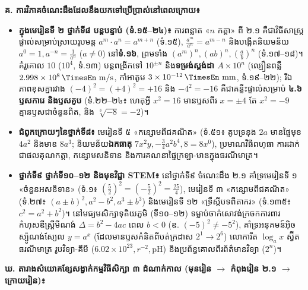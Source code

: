 \documentclass[a4paper,12pt]{article}
\newcommand{\en}[1]{{\TimesEn #1}}
\newcommand{\unit}[1]{\,\text{\en{#1}}}
\begin{document}
\Needspace{1.5cm}
\textbf{គ\en{.} ការវិភាគចំណេះដឹងដែលនឹងយកទៅប្រើប្រាស់នៅពេលក្រោយ៖}
\begin{itemize}[leftmargin=0.65cm, itemsep=3.2pt]
  \item \textbf{ក្នុងមេរៀនទី ២ ថ្នាក់ទី៨ បន្តបន្ទាប់ (ទំ\en{.}១៥\en{--}២៤)៖} ការពន្លាត «$n$ កត្តា» ពី ២\en{.}១ គឺជាវិធីសាស្ត្រផ្ទាល់សម្រាប់ស្រាយរូបមន្ត $a^m\cdot a^n = a^{m+n}$ (ទំ\en{.}១៥), $\frac{a^m}{a^n} = a^{m-n}$ និងបង្កើតនិយមន័យ $a^0=1, a^{-n}=\frac{1}{a^n}$ ($a\neq 0$) នៅ\textbf{ទំ\en{.}១៦}, ព្រមទាំង $(a^m)^n, (ab)^n, (\frac{a}{b})^n$ (ទំ\en{.}១៧\en{--}១៨)។ គំរូគោល $10$ ($10^4$, ទំ\en{.}១៣) បន្តពង្រីកទៅ $10^{\pm n}$ និង\textbf{ទម្រង់ស្តង់ដា $A\times 10^n$} (ល្បឿនពន្លឺ $2.998\times 10^8\unit{m/s}$, កាំអាតូម $3\times 10^{-12}\unit{mm}$, ទំ\en{.}១៩\en{--}២២); រីឯភាពខុសគ្នារវាង $(-4)^2 = (+4)^2 = +16$ និង $-4^2 = -16$ គឺជាគន្លឹះផ្ទាល់សម្រាប់ \textbf{៤\en{.}៦ ឫសការេ និងឫសគូប} (ទំ\en{.}២២\en{--}២៤៖ ហេតុអ្វី $x^2=16$ មានឫសពីរ $x=\pm 4$ តែ $x^2=-9$ គ្មានឫសជាចំនួនពិត, និង $\sqrt[3]{-8}=-2$)។
  \item \textbf{ជំពូកក្រោយៗនៃថ្នាក់ទី៨៖} មេរៀនទី ៥ «កន្សោមពីជគណិត» (ទំ\en{.}៥១៖ គូបទ្រនុង $2a$ មានផ្ទៃមុខ $4a^2$ និងមាឌ $8a^3$; និយមន័យ\textbf{ឯកធាតុ} $7x^2y, -\frac{3}{4}a^2b^4, 8=8x^0$), ប្រមាណវិធីពហុធា ការដាក់ជាផលគុណកត្តា, កន្សោមសនិទាន និងការគណនាផ្ទៃក្រឡា-មាឌក្នុងធរណីមាត្រ។
  \item \textbf{ថ្នាក់ទី៩ ថ្នាក់ទី១០\en{--}១២ និងមុខវិជ្ជា \en{STEM}៖} នៅថ្នាក់ទី៩ ចំណេះដឹង ២\en{.}១ គាំទ្រមេរៀនទី ១ «ចំនួនអសនិទាន» (ទំ\en{.}១៖ $(\frac{5}{2})^2=(-\frac{5}{2})^2=\frac{25}{4}$), មេរៀនទី ៣ «កន្សោមពីជគណិត» (ទំ\en{.}២៧៖ $(a\pm b)^2, a^2-b^2, a^3\pm b^3$) និងមេរៀនទី ១២ «ទ្រឹស្ដីបទពីតាករ» (ទំ\en{.}១៣៥៖ $c^2=a^2+b^2$)។ នៅមធ្យមសិក្សាទុតិយភូមិ (ទី១០\en{--}១២) ទម្លាប់ចាក់សោវង់ក្រចកការពារកំហុសឌីស្គ្រីមីណង់ $\Delta = b^2 - 4ac$ ពេល $b<0$ (ឧ\en{.} $(-5)^2\neq -5^2$), គាំទ្រអនុគមន៍អ៊ិចស្ប៉ូណង់ស្យែល $y=a^x$ (ដែលមានឫសគំនិតពីបត់ក្រដាស $2^1\to 2^6$) លោការីត $\log_a x$ ស្វ៊ីតធរណីមាត្រ រូបវិទ្យា-គីមី ($6.02\times 10^{23}, r^{-2}, \text{pH}$) និងប្រព័ន្ធគោលពីរព័ត៌មានវិទ្យា ($2^n$)។
\end{itemize}

\vspace{5pt}
\textbf{ឃ\en{.} តារាងសំយោគខ្សែសង្វាក់កម្មវិធីសិក្សា ៣ ដំណាក់កាល (មុនរៀន $\to$ កំពុងរៀន ២\en{.}១ $\to$ ក្រោយរៀន)៖}
\end{document}
